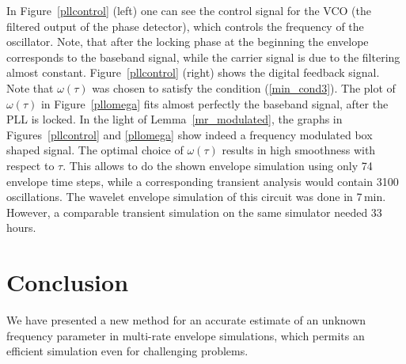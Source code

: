 \documentclass{siamltex}
\begin{document}
In Figure~\ref{pllcontrol} (left) one can see the control signal for the VCO (the filtered output
of the phase detector), which controls the frequency of the oscillator. Note, that after the locking phase at the beginning the envelope
corresponds to the baseband signal, while the carrier signal is due to the filtering almost
constant.
Figure~\ref{pllcontrol} (right) shows the digital feedback signal. Note that $\omega(\tau)$ was chosen 
to satisfy the condition (\ref{min_cond3}). The plot of $\omega(\tau)$ in Figure~\ref{pllomega}
fits almost perfectly the baseband signal, {{{after the PLL is locked}}}. 
In the light of Lemma~\ref{mr_modulated}, the graphs in
Figures~\ref{pllcontrol} and \ref{pllomega} show 
indeed a frequency modulated box shaped signal.
The optimal choice of $\omega(\tau)$ results in high smoothness with respect to $\tau$.
This allows to do the shown envelope simulation using only 74 envelope time steps, while a 
corresponding transient analysis would contain 3100 oscillations. 
The wavelet envelope simulation of this circuit was
done in 7\,min. However, a comparable transient simulation on the same simulator needed 33\,hours. 

\section{Conclusion}

We have presented a new method for an accurate estimate of an unknown frequency parameter
in multi-rate envelope simulations, which permits an efficient simulation even for challenging problems.
\end{document}
